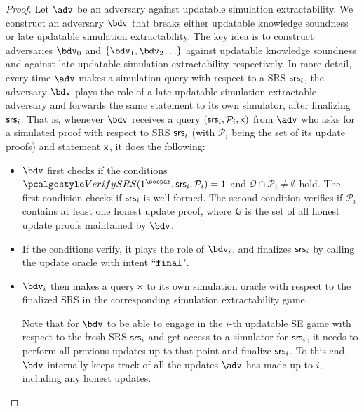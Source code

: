 \begin{proof}
	Let $\advse$ be an adversary against updatable simulation extractability. We construct an adversary $\bdv$ that breaks either updatable knowledge soundness or late updatable simulation extractability.
	The key idea is to construct adversaries $\bdv_0$ and $\{\bdv_1, \bdv_2\ldots \}$ against updatable knowledge soundness and against late updatable simulation extractability respectively. 
	In more detail, every time $\advse$ makes a simulation query with respect to a SRS $\mathsf{srs}_i$, the adversary $\bdv$ plays the role of a late updatable simulation extractable adversary and forwards the same  
	statement to its own simulator, after finalizing $\mathsf{srs}_i$. 
	That is, whenever $\bdv$ receives a query $(\mathsf{srs}_i, \mathcal{P}_i, \mathsf{x})$ from $\advse$ who asks for a simulated proof with respect to SRS $\mathsf{srs}_i$ (with $\mathcal{P}_i$ being the set of its update proofs) and statement $\mathsf{x}$, it does the following: 
	
	\begin{itemize}
		\item 
		$\bdv$ first checks if the conditions
		$\verifyCRS(1^\secpar,\srs_i, \mathcal{P}_i) = 1$ and $\mathcal{Q} \cap \mathcal{P}_i \neq \emptyset$ hold. The first condition checks if $\mathsf{srs}_i$ is well formed. The second condition verifies if $\mathcal{P}_i$ contains at least
		one honest update proof, where $\mathcal{Q}$ is the set of all honest update proofs maintained by $\bdv$. 
		\item If the conditions verify, it plays the role of $\bdv_i$, and finalizes $\mathsf{srs}_i$ by calling the update oracle with intent ``$\mathtt{final}$". 
		
		\item
		$\bdv_i$ then makes a query $\mathsf{x}$ to its own simulation oracle with respect to the finalized SRS in the corresponding simulation extractability game.
		
		Note that for $\bdv$ to be able to engage in the $i$-th updatable SE game with respect to the fresh SRS $\mathsf{srs}_{i}$ and get access to a simulator for $\mathsf{srs}_{i}$, it needs to perform all previous updates up to that point and finalize $\mathsf{srs}_{i}$. To this end, $\bdv$  internally keeps track of all the updates $\advse$ has made up to $i$, including any honest updates.
		

\end{itemize}
\end{proof}
